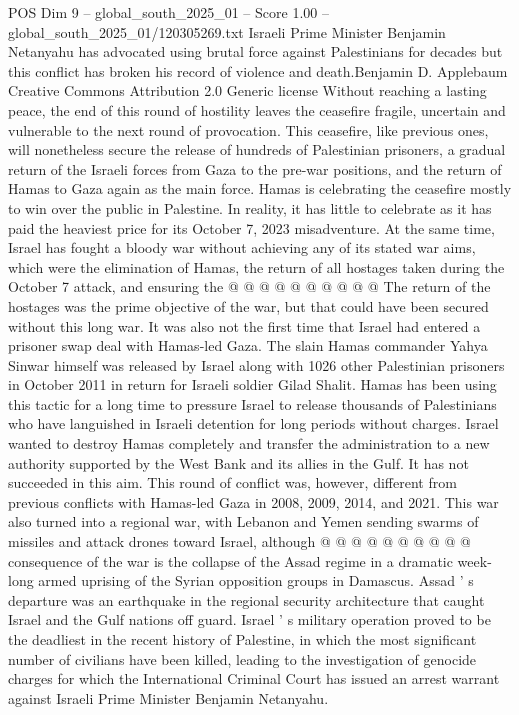 \begin{textsample}{POS Dim 9 – global\_south\_2025\_01 – Score 1.00 – global\_south\_2025\_01/120305269.txt}  \label{ex:f9_pos_311}
Israeli Prime Minister Benjamin Netanyahu has advocated using brutal force against Palestinians for decades but this conflict has broken his record of violence and death.Benjamin D.
Applebaum Creative Commons Attribution 2.0 Generic license Without reaching a lasting peace, the end of this round of hostility leaves the ceasefire fragile, uncertain and vulnerable to the next round of provocation.
This ceasefire, like previous ones, will nonetheless secure the release of hundreds of Palestinian prisoners, a gradual return of the Israeli forces from Gaza to the pre-war positions, and the return of Hamas to Gaza again as the main force.
Hamas is celebrating the ceasefire mostly to win over the public in Palestine.
In reality, it has little to celebrate as it has paid the heaviest price for its October 7, 2023 misadventure.
At the same time, Israel has fought a bloody war without achieving any of its stated war aims, which were the elimination of Hamas, the return of all hostages taken during the October 7 attack, and ensuring the @ @ @ @ @ @ @ @ @ @ The return of the hostages was the prime objective of the war, but that could have been secured without this long war.
It was also not the first time that Israel had entered a prisoner swap deal with Hamas-led Gaza.
The slain Hamas commander Yahya Sinwar himself was released by Israel along with 1026 other Palestinian prisoners in October 2011 in return for Israeli soldier Gilad Shalit.
Hamas has been using this tactic for a long time to pressure Israel to release thousands of Palestinians who have languished in Israeli detention for long periods without charges.
Israel wanted to destroy Hamas completely and transfer the administration to a new authority supported by the West Bank and its allies in the Gulf.
It has not succeeded in this aim.
This round of conflict was, however, different from previous conflicts with Hamas-led Gaza in 2008, 2009, 2014, and 2021.
This war also turned into a regional war, with Lebanon and Yemen sending swarms of missiles and attack drones toward Israel, although @ @ @ @ @ @ @ @ @ @ consequence of the war is the collapse of the Assad regime in a dramatic week-long armed uprising of the Syrian opposition groups in Damascus.
Assad ' s departure was an earthquake in the regional security architecture that caught Israel and the Gulf nations off guard.
Israel ' s military operation proved to be the deadliest in the recent history of Palestine, in which the most significant number of civilians have been killed, leading to the investigation of genocide charges for which the International Criminal Court has issued an arrest warrant against Israeli Prime Minister Benjamin Netanyahu.

\end{textsample}
